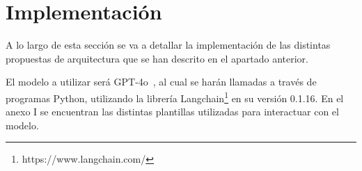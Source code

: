 \section{Implementación}
A lo largo de esta sección se va a detallar la implementación de las distintas propuestas de arquitectura que se han descrito en el apartado anterior.

El modelo a utilizar será GPT-4o~\cite{gpt4o}, al cual se harán llamadas a través de programas Python, utilizando la librería Langchain\footnote{https://www.langchain.com/} en su versión 0.1.16. En el anexo I se encuentran las distintas plantillas utilizadas para interactuar con el modelo.



